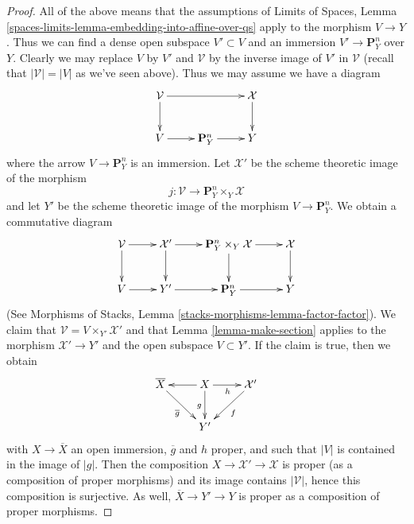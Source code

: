 \documentclass{stacks-project}
\theoremstyle{plain}
\theoremstyle{definition}
\theoremstyle{remark}
\numberwithin{equation}{subsection}
\begin{document}
\begin{proof}
\medskip\noindent
All of the above means that the assumptions of
Limits of Spaces, Lemma \ref{spaces-limits-lemma-embedding-into-affine-over-qs}
apply to the morphism $V \to Y$. Thus we can find a dense open
subspace $V' \subset V$ and an immersion $V' \to \mathbf{P}^n_Y$
over $Y$. Clearly we may replace $V$ by $V'$ and $\mathcal{V}$
by the inverse image of $V'$ in $\mathcal{V}$ (recall that
$|\mathcal{V}| = |V|$ as we've seen above).
Thus we may assume we have a diagram
$$
\xymatrix{
\mathcal{V} \ar[rr] \ar[d] & & \mathcal{X} \ar[d] \\
V \ar[r] & \mathbf{P}^n_Y \ar[r] & Y
}
$$
where the arrow $V \to \mathbf{P}^n_Y$ is an immersion.
Let $\mathcal{X}'$ be the scheme theoretic image of the morphism
$$
j : \mathcal{V} \longrightarrow \mathbf{P}^n_Y \times_Y \mathcal{X}
$$
and let $Y'$ be the scheme theoretic image of the morphism
$V \to \mathbf{P}^n_Y$. We obtain a commutative diagram
$$
\xymatrix{
\mathcal{V} \ar[r] \ar[d] &
\mathcal{X}' \ar[r] \ar[d] &
\mathbf{P}^n_Y \times_Y \mathcal{X} \ar[d] \ar[r] &
\mathcal{X} \ar[d] \\
V \ar[r] &
Y' \ar[r] &
\mathbf{P}^n_Y \ar[r] &
Y
}
$$
(See Morphisms of Stacks, Lemma \ref{stacks-morphisms-lemma-factor-factor}).
We claim that $\mathcal{V} = V \times_{Y'} \mathcal{X}'$ and that
Lemma \ref{lemma-make-section} applies to the morphism $\mathcal{X}' \to Y'$
and the open subspace $V \subset Y'$. If the claim is true, then we obtain
$$
\xymatrix{
\overline{X} \ar[rd]_{\overline{g}} &
X \ar[l] \ar[d]_g \ar[r]_h & \mathcal{X}' \ar[ld]^f \\
& Y'
}
$$
with $X \to \overline{X}$ an open immersion, $\overline{g}$ and $h$ proper,
and such that $|V|$ is contained in the image of $|g|$.
Then the composition $X \to \mathcal{X}' \to \mathcal{X}$ is
proper (as a composition of proper morphisms) and its image
contains $|\mathcal{V}|$, hence this composition is surjective.
As well, $\overline{X} \to Y' \to Y$ is proper as a composition
of proper morphisms.


\end{proof}
\end{document}
